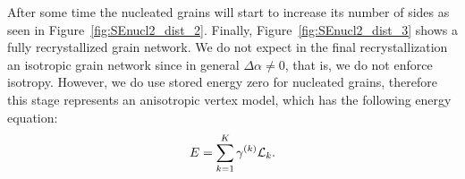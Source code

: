 After some time the nucleated grains will start to increase its number of sides as seen in Figure~\ref{fig:SEnucl2_dist_2}. 
Finally, Figure~\ref{fig:SEnucl2_dist_3} shows a fully recrystallized grain network. We do not expect in the final recrystallization an isotropic grain network since in general $\Delta \alpha \neq 0$, that is, we do not enforce isotropy. 
However, we do use stored energy zero for nucleated grains, therefore this stage represents an anisotropic vertex model, which has the following energy equation:
\begin{equation*}
    E = \sum_{k=1}^{K} \gamma^{(k)}\mathcal{L}_k.
\end{equation*}
%
\begin{figure}[ht]
    \centering
    \\%
\end{figure}

